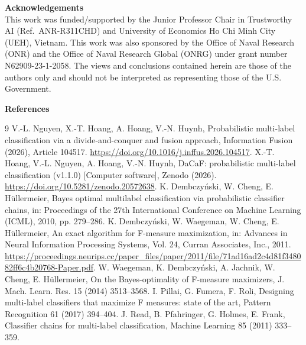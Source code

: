 \documentclass[11pt, letterpaper]{article}
\begin{document}
\noindent\textbf{Acknowledgements}\\
This work was funded/supported by the Junior Professor Chair in Trustworthy AI
(Ref.~ANR-R311CHD) and University of Economics Ho Chi Minh City (UEH), Vietnam. This work
was also sponsored by the Office of Naval Research (ONR) and the Office of Naval Research
Global (ONRG) under grant number N62909-23-1-2058. The views and conclusions contained
herein are those of the authors only and should not be interpreted as representing those
of the U.S. Government.
\vskip0.5cm

\noindent
\textbf{References}\\
\begin{thebibliography}{9}
 V.-L. Nguyen, X.-T. Hoang, A. Hoang, V.-N. Huynh,
  Probabilistic multi-label classification via a divide-and-conquer and fusion
  approach, Information Fusion (2026), Article 104517.
  \url{https://doi.org/10.1016/j.inffus.2026.104517}.
 X.-T. Hoang, V.-L. Nguyen, A. Hoang, V.-N. Huynh,
  DaCaF: probabilistic multi-label classification (v1.1.0) [Computer software],
  Zenodo (2026). \url{https://doi.org/10.5281/zenodo.20572638}.
 K. Dembczy\'nski, W. Cheng, E. H\"ullermeier,
  Bayes optimal multilabel classification via probabilistic classifier chains, in:
  Proceedings of the 27th International Conference on Machine Learning (ICML), 2010,
  pp. 279--286.
 K. Dembczy\'nski, W. Waegeman, W. Cheng, E. H\"ullermeier,
  An exact algorithm for F-measure maximization, in: Advances in Neural Information
  Processing Systems, Vol. 24, Curran Associates, Inc., 2011.
  \url{https://proceedings.neurips.cc/paper_files/paper/2011/file/71ad16ad2c4d81f348082ff6c4b20768-Paper.pdf}.
 W. Waegeman, K. Dembczy\'nski, A. Jachnik, W. Cheng, E. H\"ullermeier,
  On the Bayes-optimality of F-measure maximizers, J. Mach. Learn. Res. 15 (2014) 3513--3568.
 I. Pillai, G. Fumera, F. Roli,
  Designing multi-label classifiers that maximize F measures: state of the art,
  Pattern Recognition 61 (2017) 394--404.
 J. Read, B. Pfahringer, G. Holmes, E. Frank,
  Classifier chains for multi-label classification, Machine Learning 85 (2011) 333--359.

\end{thebibliography}
\end{document}
